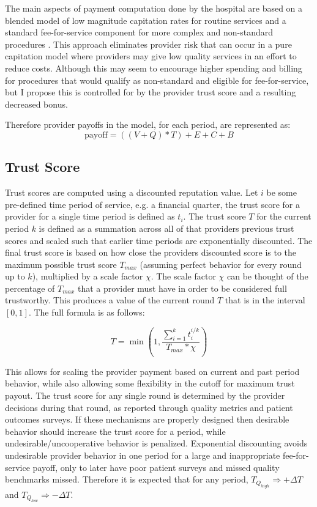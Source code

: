 \documentclass{article}
\begin{document}
The main aspects of payment computation done by the hospital are based on a blended model of low magnitude capitation rates for routine services and a standard fee-for-service component for more complex and non-standard procedures \cite{blended}. This approach eliminates provider risk that can occur in a pure capitation model where providers may give low quality services in an effort to reduce costs. Although this may seem to encourage higher spending and billing for procedures that would qualify as non-standard and eligible for fee-for-service, but I propose this is controlled for by the provider trust score and a resulting decreased bonus.

Therefore provider payoffs in the model, for each period, are represented as:
\begin{equation}
    \text{payoff} = ((V + Q) * T) + E + C + B
\end{equation}

\subsection{Trust Score} \label{sec:trustscore}
Trust scores are computed using a discounted reputation value. Let $i$ be some pre-defined time period of service, e.g. a financial quarter, the trust score for a provider for a single time period is defined as $t_i$. The trust score $T$ for the current period $k$ is defined as a summation across all of that providers previous trust scores and scaled such that earlier time periods are exponentially discounted. The final trust score is based on how close the providers discounted score is to the maximum possible trust score $T_{max}$ (assuming perfect behavior for every round up to $k$), multiplied by a scale factor $\chi$. The scale factor $\chi$ can be thought of the percentage of $T_{max}$ that a provider must have in order to be considered full trustworthy. This produces a value of the current round $T$ that is in the interval $[0, 1]$. The full formula is as follows:

\begin{equation}
    T = \min \left( 1, \frac{\sum_{i=1}^k t_i^{i / k}} {T_{max} * \chi} \right)
\end{equation}

This allows for scaling the provider payment based on current and past period behavior, while also allowing some flexibility in the cutoff for maximum trust payout. The trust score for any single round is determined by the provider decisions during that round, as reported through quality metrics and patient outcomes surveys. If these mechanisms are properly designed then desirable behavior should increase the trust score for a period, while undesirable/uncooperative behavior is penalized. Exponential discounting avoids undesirable provider behavior in one period for a large and inappropriate fee-for-service payoff, only to later have poor patient surveys and missed quality benchmarks missed. Therefore it is expected that for any period, $T_{Q_{high}} \Rightarrow +\Delta T$ and $T_{Q_{low}} \Rightarrow -\Delta T$.
\end{document}
